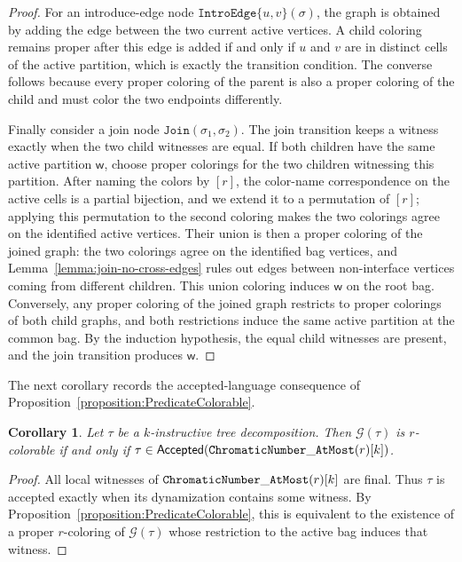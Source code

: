 \documentclass[11pt,a4paper]{article}
\newtheorem{corollary}[theorem]{Corollary}
\newcommand{\treewidthvalue}{k}
\newcommand{\decompositiongraph}[1]{\mathcal{G}(#1)}
\newcommand{\introedgegeneric}[2]{\mathtt{IntroEdge}\{#1,#2\}}
\newcommand{\joingenericcore}{\mathtt{Join}}
\newcommand{\accepteddecompositions}[1]{\mathsf{Accepted}(#1)}
\newcommand{\abstractdecomposition}{\tau}
\newcommand{\sigmaabstractdecomposition}{\sigma}
\newcommand{\vertexone}{u}
\newcommand{\vertextwo}{v}
\newcommand{\awitness}{\mathsf{w}}
\newcommand{\dpNamePart}[1]{\mbox{\normalfont\ttfamily #1}}
\newcommand{\numbercolors}{r}
\newcommand{\chromaticnumberAtMostCore}[1]{\dpNamePart{ChromaticNumber}\_\allowbreak\dpNamePart{AtMost}(#1)}
\begin{document}
\begin{proof}
For an introduce-edge node $\introedgegeneric{\vertexone}{\vertextwo}(\sigmaabstractdecomposition)$, the graph is obtained by adding the edge between the two current active vertices. A child coloring remains proper after this edge is added if and only if $\vertexone$ and $\vertextwo$ are in distinct cells of the active partition, which is exactly the transition condition. The converse follows because every proper coloring of the parent is also a proper coloring of the child and must color the two endpoints differently.

Finally consider a join node $\joingenericcore(\sigmaabstractdecomposition_1,\sigmaabstractdecomposition_2)$. The join transition keeps a witness exactly when the two child witnesses are equal. If both children have the same active partition $\awitness$, choose proper colorings for the two children witnessing this partition. After naming the colors by $[\numbercolors]$, the color-name correspondence on the active cells is a partial bijection, and we extend it to a permutation of $[\numbercolors]$; applying this permutation to the second coloring makes the two colorings agree on the identified active vertices. Their union is then a proper coloring of the joined graph: the two colorings agree on the identified bag vertices, and Lemma~\ref{lemma:join-no-cross-edges} rules out edges between non-interface vertices coming from different children. This union coloring induces $\awitness$ on the root bag. Conversely, any proper coloring of the joined graph restricts to proper colorings of both child graphs, and both restrictions induce the same active partition at the common bag. By the induction hypothesis, the equal child witnesses are present, and the join transition produces $\awitness$.
\end{proof}

The next corollary records the accepted-language consequence of
Proposition~\ref{proposition:PredicateColorable}.


%

\begin{corollary}
\label{corollary:CorrectnessColorability}
Let $\abstractdecomposition$ be a $\treewidthvalue$-instructive tree
decomposition. Then $\decompositiongraph{\abstractdecomposition}$
is $\numbercolors$-colorable if and only if $\abstractdecomposition\in
\accepteddecompositions{\chromaticnumberAtMostCore{\numbercolors}[\treewidthvalue]}$.
\end{corollary}
\begin{proof}
All local witnesses of $\chromaticnumberAtMostCore{\numbercolors}[\treewidthvalue]$ are final. Thus $\abstractdecomposition$ is accepted exactly when its dynamization contains some witness. By Proposition~\ref{proposition:PredicateColorable}, this is equivalent to the existence of a proper $\numbercolors$-coloring of $\decompositiongraph{\abstractdecomposition}$ whose restriction to the active bag induces that witness.
\end{proof}
\end{document}
